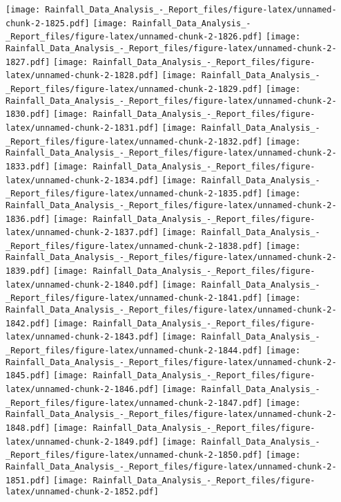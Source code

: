 \documentclass[
]{article}
\begin{document}
\texttt{[image: Rainfall\_Data\_Analysis\_-\_Report\_files/figure-latex/unnamed-chunk-2-1825.pdf]}
\texttt{[image: Rainfall\_Data\_Analysis\_-\_Report\_files/figure-latex/unnamed-chunk-2-1826.pdf]}
\texttt{[image: Rainfall\_Data\_Analysis\_-\_Report\_files/figure-latex/unnamed-chunk-2-1827.pdf]}
\texttt{[image: Rainfall\_Data\_Analysis\_-\_Report\_files/figure-latex/unnamed-chunk-2-1828.pdf]}
\texttt{[image: Rainfall\_Data\_Analysis\_-\_Report\_files/figure-latex/unnamed-chunk-2-1829.pdf]}
\texttt{[image: Rainfall\_Data\_Analysis\_-\_Report\_files/figure-latex/unnamed-chunk-2-1830.pdf]}
\texttt{[image: Rainfall\_Data\_Analysis\_-\_Report\_files/figure-latex/unnamed-chunk-2-1831.pdf]}
\texttt{[image: Rainfall\_Data\_Analysis\_-\_Report\_files/figure-latex/unnamed-chunk-2-1832.pdf]}
\texttt{[image: Rainfall\_Data\_Analysis\_-\_Report\_files/figure-latex/unnamed-chunk-2-1833.pdf]}
\texttt{[image: Rainfall\_Data\_Analysis\_-\_Report\_files/figure-latex/unnamed-chunk-2-1834.pdf]}
\texttt{[image: Rainfall\_Data\_Analysis\_-\_Report\_files/figure-latex/unnamed-chunk-2-1835.pdf]}
\texttt{[image: Rainfall\_Data\_Analysis\_-\_Report\_files/figure-latex/unnamed-chunk-2-1836.pdf]}
\texttt{[image: Rainfall\_Data\_Analysis\_-\_Report\_files/figure-latex/unnamed-chunk-2-1837.pdf]}
\texttt{[image: Rainfall\_Data\_Analysis\_-\_Report\_files/figure-latex/unnamed-chunk-2-1838.pdf]}
\texttt{[image: Rainfall\_Data\_Analysis\_-\_Report\_files/figure-latex/unnamed-chunk-2-1839.pdf]}
\texttt{[image: Rainfall\_Data\_Analysis\_-\_Report\_files/figure-latex/unnamed-chunk-2-1840.pdf]}
\texttt{[image: Rainfall\_Data\_Analysis\_-\_Report\_files/figure-latex/unnamed-chunk-2-1841.pdf]}
\texttt{[image: Rainfall\_Data\_Analysis\_-\_Report\_files/figure-latex/unnamed-chunk-2-1842.pdf]}
\texttt{[image: Rainfall\_Data\_Analysis\_-\_Report\_files/figure-latex/unnamed-chunk-2-1843.pdf]}
\texttt{[image: Rainfall\_Data\_Analysis\_-\_Report\_files/figure-latex/unnamed-chunk-2-1844.pdf]}
\texttt{[image: Rainfall\_Data\_Analysis\_-\_Report\_files/figure-latex/unnamed-chunk-2-1845.pdf]}
\texttt{[image: Rainfall\_Data\_Analysis\_-\_Report\_files/figure-latex/unnamed-chunk-2-1846.pdf]}
\texttt{[image: Rainfall\_Data\_Analysis\_-\_Report\_files/figure-latex/unnamed-chunk-2-1847.pdf]}
\texttt{[image: Rainfall\_Data\_Analysis\_-\_Report\_files/figure-latex/unnamed-chunk-2-1848.pdf]}
\texttt{[image: Rainfall\_Data\_Analysis\_-\_Report\_files/figure-latex/unnamed-chunk-2-1849.pdf]}
\texttt{[image: Rainfall\_Data\_Analysis\_-\_Report\_files/figure-latex/unnamed-chunk-2-1850.pdf]}
\texttt{[image: Rainfall\_Data\_Analysis\_-\_Report\_files/figure-latex/unnamed-chunk-2-1851.pdf]}
\texttt{[image: Rainfall\_Data\_Analysis\_-\_Report\_files/figure-latex/unnamed-chunk-2-1852.pdf]}
\end{document}
